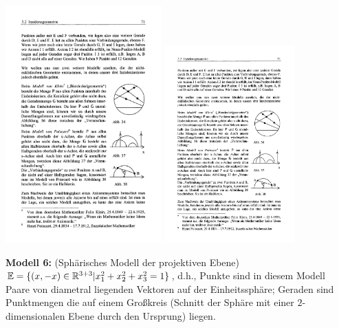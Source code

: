\centerline{
\includegraphics[width=6cm]{BILDER/BildPoincareHalbebene1.pdf}
\hspace*{1cm}
\includegraphics[width=5cm]{BILDER/BildPoincareHalbebene2.pdf}
}


\medskip


{\bf Modell 6:} (\glqq Sphärisches Modell der projektiven Ebene\grqq )\\
$\mathbb E=\{ (x,-x)\in\mathbb R^{3+3} | x_1^2+  x_2^2 + x_3^2= 1 \}$, d.h.,
Punkte sind in diesem Modell Paare von diametral liegenden Vektoren auf der
Einheitssphäre;
Geraden sind Punktmengen die auf einem Großkreis (Schnitt der Sphäre
mit einer $2$-dimensionalen Ebene durch den Ursprung) liegen.






